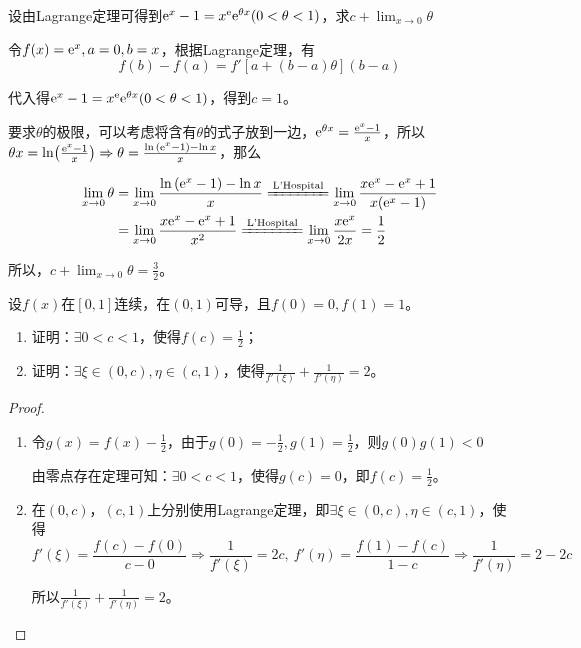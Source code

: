 \begin{problem}
	设由Lagrange定理可得到${\rm e}^x-1=x^{\rm e} {\rm e}^{\theta x}(0<\theta <1)$，求$c+\lim_{x\to 0}\theta$
	
	\begin{solution}
		令$f(x)={\rm e}^x,a=0,b=x$，根据Lagrange定理，有
		\[f(b)-f(a)=f'[a+(b-a)\theta](b-a)\]
		
		代入得${\rm e}^x-1=x^{\rm e} {\rm e}^{\theta x}(0<\theta <1)$，得到$c=1$。
		
		要求$\theta$的极限，可以考虑将含有$\theta$的式子放到一边，${\rm e}^{\theta x}=\frac{{\rm e}^x-1}{x}$，所以$\theta x=\ln(\frac{{\rm e}^x-1}{x})\Rightarrow \theta=\frac{\ln{({\rm e}^x-1)}-\ln{x}}{x}$，那么
		
		\begin{align*}
		    \lim_{x\to 0}\theta&=\lim_{x\to 0}\frac{\ln{({\rm e}^x-1)}-\ln{x}}{x}\xlongequal{\text{L'Hospital}}\lim_{x\to 0}\frac{x {\rm e}^x-{\rm e}^x+1}{x({\rm e}^x-1)}\\
			&=\lim_{x\to 0}\frac{x {\rm e}^x-{\rm e}^x+1}{x^2}\xlongequal{\text{L'Hospital}}\lim_{x\to 0}\frac{x {\rm e}^x}{2x}=\frac{1}{2}
		\end{align*}
	
		所以，$c+\lim_{x\to 0}\theta=\frac{3}{2}$。
	\end{solution}
\end{problem}

\begin{problem}
	设$f(x)$在$[0,1]$连续，在$(0,1)$可导，且$f(0)=0, f(1)=1$。
	\begin{enumerate}[label=（\arabic*）]
	    \item 证明：$\exists 0<c<1$，使得$f(c)=\frac{1}{2}$；
	    \item 证明：$\exists\xi\in (0,c),\eta\in (c,1)$，使得$\frac{1}{f'(\xi)}+\frac{1}{f'(\eta)}=2$。
	\end{enumerate}
	
	\begin{proof}
		\begin{enumerate}[label=（\arabic*）]
			\item 令$g(x)=f(x)-\frac{1}{2}$，由于$g(0)=-\frac{1}{2},g(1)=\frac{1}{2}$，则$g(0)g(1)<0$
			
			由零点存在定理可知：$\exists 0<c<1$，使得$g(c)=0$，即$f(c)=\frac{1}{2}$。
			
			\item 在$(0,c)$，$(c,1)$上分别使用Lagrange定理，即$\exists\xi\in (0,c),\eta\in (c,1)$，使得
			\[f'(\xi)=\frac{f(c)-f(0)}{c-0}\Rightarrow \frac{1}{f'(\xi)}=2c,~ f'(\eta)=\frac{f(1)-f(c)}{1-c}\Rightarrow\frac{1}{f'(\eta)}=2-2c\]
			
			所以$\frac{1}{f'(\xi)}+\frac{1}{f'(\eta)}=2$。
		\end{enumerate}
	\end{proof}
\end{problem}

